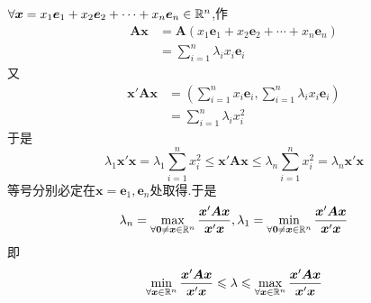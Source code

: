 $\forall\bm{x}=x_1\bm{e}_1+x_2\bm{e}_2+\cdots+x_n\bm{e}_n\in\mathbb{R} ^n$,作\begin{align*}
    \bm{Ax} & =\bm{A}\left(
    x_1\bm{e}_1+x_2\bm{e}_2+\cdots+x_n\bm{e}_n
    \right)                                       \\
            & =\sum_{i=1}^{n}\lambda_ix_i\bm{e}_i
\end{align*}又\begin{align*}
    \bm{x}'\bm{Ax} & =\left(
    \sum_{i=1}^{n}x_i\bm{e}_i,\sum_{i=1}^{n}\lambda_ix_i\bm{e}_i
    \right)                                        \\
                   & =\sum_{i=1}^{n}\lambda_ix_i^2
\end{align*}于是\[
    \lambda_1\bm{x}'\bm{x}=\lambda_1\sum_{i=1}^{n}x_i^2\leqslant\bm{x}'\bm{Ax}\leqslant\lambda_n\sum_{i=1}^{n}x_i^2=\lambda_n\bm{x}'\bm{x}
\]等号分别必定在$\bm{x}=\bm{e}_1,\bm{e}_n$处取得.于是\[
    \lambda_n=\max_{\forall\bm{0}\neq\bm{x}\in\mathbb{R} ^n}\frac{\bm{x}'\bm{Ax}}{\bm{x}'\bm{x}},\lambda_1=\min_{\forall\bm{0}\neq\bm{x}\in\mathbb{R} ^n}\frac{\bm{x}'\bm{Ax}}{\bm{x}'\bm{x}}
\]即\[
    \min_{\forall\bm{x}\in\mathbb{R} ^n}\frac{\bm{x}'\bm{Ax}}{\bm{x}'\bm{x}}\leqslant\lambda\leqslant\max_{\forall\bm{x}\in\mathbb{R} ^n}\frac{\bm{x}'\bm{Ax}}{\bm{x}'\bm{x}}
\]
